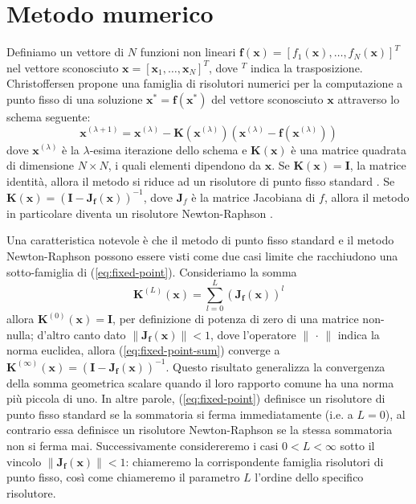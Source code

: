 \chapter{Metodo mumerico}
	Definiamo un vettore di $N$ funzioni non lineari $\mathbf{f(x)} = [f_{1}(\mathbf{x}), \dots , f_{N}(\mathbf{x})]^{T}$ nel vettore sconosciuto $\mathbf{x} = [\mathbf{x}_{1}, \dots , \mathbf{x}_{N}]^{T}$, dove $^T$ indica la trasposizione. Christoffersen \cite{christoffersen} propone una famiglia di risolutori numerici per la computazione a punto fisso di una soluzione $\mathbf{x}^{*} = \mathbf{f(x^{*})}$ del vettore sconosciuto $\mathbf{x}$ attraverso lo schema seguente:
	\begin{equation}
		\label{eq:fixed-point}
		\mathbf{x}^{(\lambda+1)} = \mathbf{x}^{(\lambda)}-\mathbf{K}(\mathbf{x}^{(\lambda)})(\mathbf{x}^{(\lambda)}-\mathbf{f}(\mathbf{x}^{(\lambda)}))
	\end{equation}
	dove $\mathbf{x}^{(\lambda)}$ è la $\lambda$-esima iterazione dello schema e $\mathbf{K(x)}$ è una matrice quadrata di dimensione $N \times N$, i quali elementi dipendono da $\mathbf{x}$. Se $\mathbf{K}(\mathbf{x}) = \mathbf{I}$, la matrice identità, allora il metodo si riduce ad un risolutore di punto fisso standard \cite{atkinson}. Se $\mathbf{K}(\mathbf{x}) = (\mathbf{I}-\mathbf{J_{f}(x)})^{-1}$, dove $\mathbf{J}_{f}$ è la matrice Jacobiana di $f$, allora il metodo in particolare diventa un risolutore Newton-Raphson \cite{atkinson}.
		
	Una caratteristica notevole è che il metodo di punto fisso standard e il metodo Newton-Raphson possono essere visti come due casi limite che racchiudono una sotto-famiglia di (\ref{eq:fixed-point}). Consideriamo la somma
	\begin{equation}
		\label{eq:fixed-point-sum}
		\mathbf{K}^{(L)}(\mathbf{x}) = \sum_{l=0}^{L} \left(\mathbf{J_{f}(x)}\right)^{l}
	\end{equation}
	allora $\mathbf{K}^{(0)}(\mathbf{x}) = \mathbf{I}$, per definizione di potenza di zero di una matrice non-nulla; d'altro canto dato $\lVert\mathbf{J_{f}(x)}\rVert < 1$, dove l'operatore $\lVert\,\cdot\,\rVert$ indica la norma euclidea, allora (\ref{eq:fixed-point-sum}) converge a $\mathbf{K}^{(\infty)}(\mathbf{x}) = (\mathbf{I}-\mathbf{J_{f}(x)})^{-1}$. Questo risultato generalizza la convergenza della somma geometrica scalare quando il loro rapporto comune ha una norma più piccola di uno. In altre parole, (\ref{eq:fixed-point}) definisce un risolutore di punto fisso standard se la sommatoria si ferma immediatamente (i.e. a $L = 0$), al contrario essa definisce un risolutore Newton-Raphson se la stessa sommatoria non si ferma mai. Successivamente considereremo i casi $0 < L < \infty$ sotto il vincolo $\lVert\mathbf{J_{f}(x)}\rVert < 1$: chiameremo la corrispondente famiglia risolutori di punto fisso, così come chiameremo il parametro $L$ l'ordine dello specifico risolutore.